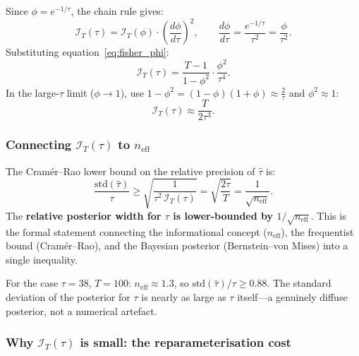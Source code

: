 \documentclass[11pt, a4paper]{article}
\begin{document}
Since $\phi = e^{-1/\tau}$, the chain rule gives:
\begin{equation}
    \mathcal{I}_T(\tau) = \mathcal{I}_T(\phi)\cdot\left(\frac{d\phi}{d\tau}\right)^{\!2},
    \qquad \frac{d\phi}{d\tau} = \frac{e^{-1/\tau}}{\tau^2} = \frac{\phi}{\tau^2}.
\end{equation}
Substituting equation~\eqref{eq:fisher_phi}:
\begin{equation}
    \mathcal{I}_T(\tau)
    = \frac{T-1}{1-\phi^2}\cdot\frac{\phi^2}{\tau^4}.
\end{equation}
In the large-$\tau$ limit ($\phi \to 1$),
use $1-\phi^2 = (1-\phi)(1+\phi) \approx \frac{2}{\tau}$ and $\phi^2 \approx 1$:
\begin{equation}
    \boxed{
        \mathcal{I}_T(\tau) \approx \frac{T}{2\tau^3}.
    }
    \label{eq:fisher_tau}
\end{equation}

\subsubsection*{Connecting $\mathcal{I}_T(\tau)$ to $n_\mathrm{eff}$}

The Cram\'er--Rao lower bound on the relative precision of $\hat\tau$ is:
\begin{equation}
    \frac{\mathrm{std}(\hat\tau)}{\tau}
    \geq \sqrt{\frac{1}{\tau^2\,\mathcal{I}_T(\tau)}}
    = \sqrt{\frac{2\tau}{T}}
    = \frac{1}{\sqrt{n_\mathrm{eff}}}.
    \label{eq:crb_tau_neff}
\end{equation}
The \textbf{relative posterior width for $\tau$ is lower-bounded by
$1/\sqrt{n_\mathrm{eff}}$}.
This is the formal statement connecting the informational concept ($n_\mathrm{eff}$),
the frequentist bound (Cram\'er--Rao), and the Bayesian posterior (Bernstein--von Mises)
into a single inequality.

For the case $\tau = 38$, $T = 100$: $n_\mathrm{eff} \approx 1.3$, so
$\mathrm{std}(\hat\tau)/\tau \geq 0.88$.
The standard deviation of the posterior for $\tau$ is nearly as large as $\tau$
itself---a genuinely diffuse posterior, not a numerical artefact.

\subsubsection*{Why $\mathcal{I}_T(\tau)$ is small: the reparameterisation cost}
\end{document}
